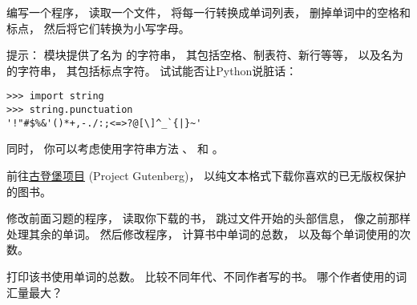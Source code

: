 \begin{exercise}


编写一个程序， 读取一个文件， 将每一行转换成单词列表， 删掉单词中的空格和标点， 然后将它们转换为小写字母。  



提示：  模块提供了名为  的字符串， 
其包括空格、制表符、新行等等， 以及名为  的字符串， 
其包括标点字符。   试试能否让Python说脏话：

\begin{lstlisting}
>>> import string
>>> string.punctuation
'!"#$%&'()*+,-./:;<=>?@[\]^_`{|}~'
\end{lstlisting}


同时， 你可以考虑使用字符串方法  、  和 。  

\end{exercise}

\begin{exercise}


前往\href{http://gutenberg.org}{古登堡项目} (Project Gutenberg)， 以纯文本格式下载你喜欢的已无版权保护的图书。  



修改前面习题的程序， 读取你下载的书， 
跳过文件开始的头部信息， 像之前那样处理其余的单词。  
然后修改程序， 计算书中单词的总数， 以及每个单词使用的次数。  



打印该书使用单词的总数。   比较不同年代、不同作者写的书。  
哪个作者使用的词汇量最大？

\end{exercise}

